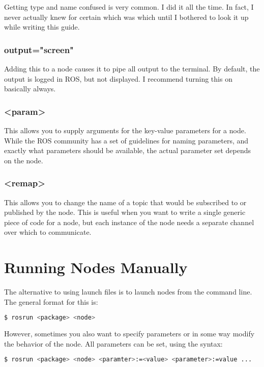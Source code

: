 Getting type and name confused is very common. I did it all the time. In fact, I never actually knew for certain which was which until I bothered to look it up while writing this guide.
 
\subsubsection{output="screen"}
 
Adding this to a node causes it to pipe all output to the terminal. By default, the output is logged in ROS, but not displayed. I recommend turning this on basically always.
 
\subsubsection{<param>}
 
This allows you to supply arguments for the key-value parameters for a node. While the ROS community has a set of guidelines for naming parameters, and exactly what parameters should be available, the actual parameter set depends on the node.

\subsubsection{<remap>}

This allows you to change the name of a topic that would be subscribed to or published by the node. This is useful when you want to write a single generic piece of code for a node, but each instance of the node needs a separate channel over which to communicate.

\section{Running Nodes Manually}

The alternative to using launch files is to launch nodes from the command line. The general format for this is:

\begin{lstlisting}[language=bash]
  $ rosrun <package> <node>
\end{lstlisting}
 
However, sometimes you also want to specify parameters or in some way modify the behavior of the node. All parameters can be set, using the syntax:
 
 \begin{lstlisting}[language=bash]
  $ rosrun <package> <node> <paramter>:=<value> <parameter>:=value ...
\end{lstlisting}

